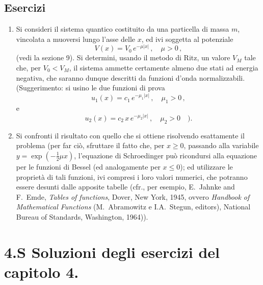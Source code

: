 \documentclass[11pt, a4paper]{book}
\numberwithin{equation}{section}
\newenvironment{esercizi}{\subsection*{Esercizi}\begin{enumerate}}{\end{enumerate}}
\begin{document}
\begin{esercizi}
\item Si consideri il sistema quantico costituito da una particella di
massa $m$, vincolata a muoversi lungo l'asse delle $x$, ed ivi
soggetta al potenziale
\[
V(x) = V_0\, e^{-\mu|x|} \,, \quad \mu > 0 \,,
\]
(vedi la sezione 9). Si determini, usando il metodo di Ritz, un valore
$V_M$ tale che, per $V_0 < V_M$, il sistema ammette certamente
almeno due stati ad energia negativa, che saranno dunque descritti
da funzioni d'onda normalizzabili.\\
(Suggerimento: si usino le due funzioni di prova
\[
u_1(x) = c_1\, e^{-\mu_1 |x|} \,, \quad \mu_1 > 0 \,,
\]
e
\[
u_2(x) = c_2\, x\, e^{-\mu_2 |x|} \,, \quad \mu_2 > 0 \quad ).
\]

\item[*] Si confronti il risultato con quello che si ottiene risolvendo
esattamente il problema (per far ciò, sfruttare il fatto che, per
$x \geq 0$, passando alla variabile $y = \exp(-\frac{1}{2}\mu x)$, l'equazione di
Schroedinger può ricondursi alla equazione per le funzioni di Bessel
(ed analogamente per $x \leq 0$); ed utilizzare le proprietà di tali
funzioni, ivi compresi i loro valori numerici, che potranno essere
desunti dalle apposite tabelle (cfr., per esempio, E.\ Jahnke and
F.\ Emde, \emph{Tables of functions}, Dover, New York, 1945, ovvero
\emph{Handbook of Mathematical Functions} (M.\ Abramowitz e I.A.\ Stegun,
editors), National Bureau of Standards, Washington, 1964)).
\end{esercizi}

\section*{4.S \quad Soluzioni degli esercizi del capitolo 4.}
\end{document}
